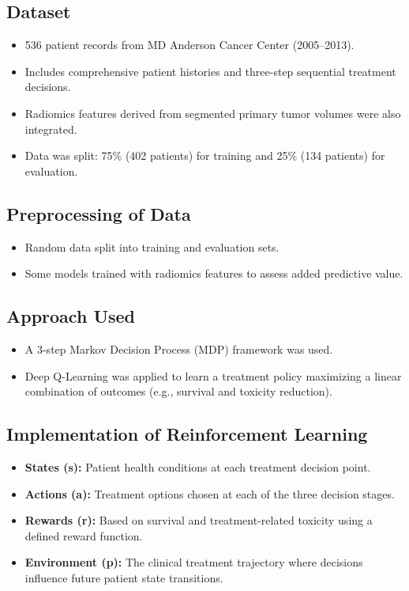 \subsection*{Dataset}
\begin{itemize}
    \item 536 patient records from MD Anderson Cancer Center (2005–2013).
    \item Includes comprehensive patient histories and three-step sequential treatment decisions.
    \item Radiomics features derived from segmented primary tumor volumes were also integrated.
    \item Data was split: 75\% (402 patients) for training and 25\% (134 patients) for evaluation.
\end{itemize}

\subsection*{Preprocessing of Data}
\begin{itemize}
    \item Random data split into training and evaluation sets.
    \item Some models trained with radiomics features to assess added predictive value.
\end{itemize}

\subsection*{Approach Used}
\begin{itemize}
    \item A 3-step Markov Decision Process (MDP) framework was used.
    \item Deep Q-Learning was applied to learn a treatment policy maximizing a linear combination of outcomes (e.g., survival and toxicity reduction).
\end{itemize}

\subsection*{Implementation of Reinforcement Learning}
\begin{itemize}
    \item \textbf{States (s):} Patient health conditions at each treatment decision point.
    \item \textbf{Actions (a):} Treatment options chosen at each of the three decision stages.
    \item \textbf{Rewards (r):} Based on survival and treatment-related toxicity using a defined reward function.
    \item \textbf{Environment (p):} The clinical treatment trajectory where decisions influence future patient state transitions.
\end{itemize}

